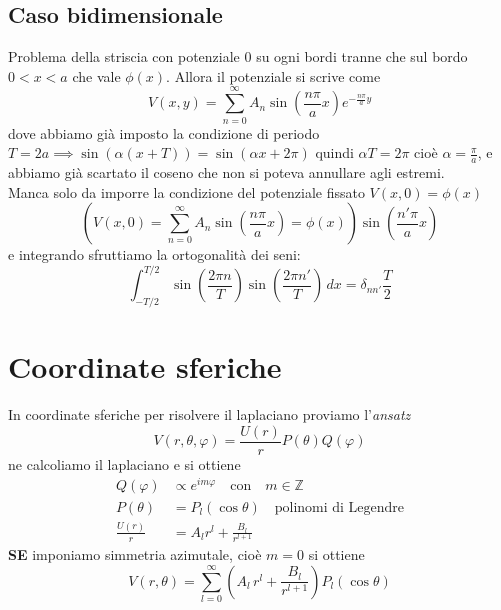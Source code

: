 \subsection{Caso bidimensionale}
Problema della striscia con potenziale $ 0 $ su ogni bordi tranne che sul bordo $ 0<x<a $ che vale $ \phi(x) $.
Allora il potenziale si scrive come 
\begin{equation}
  V(x,y) = \sum_{n = 0}^{\infty} A_n \sin\left( \frac{n\pi}{a} x \right) e^{-\frac{n\pi}{a} y}
\end{equation}
dove abbiamo già imposto la condizione di periodo $ T = 2a \implies \sin (\alpha (x + T)) = \sin(\alpha x + 2\pi) $ quindi $ \alpha T = 2\pi $
cioè $ \alpha = \frac{\pi}{a} $, e abbiamo già scartato il coseno che non si poteva annullare agli estremi.\\
Manca solo da imporre la condizione del potenziale fissato $ V (x,0) = \phi(x) $ 
\begin{equation}
  \left( V(x,0) = \sum_{n = 0}^{\infty} A_n \sin\left( \frac{n\pi}{a} x \right) = \phi(x) \right) \sin\left(  \frac{n'\pi}{a} x \right)
\end{equation}
e integrando sfruttiamo la ortogonalità dei seni:
\begin{equation}
  \int_{-T/2}^{T/2} \sin \left( \frac{2\pi n}{T} \right) \sin \left( \frac{2\pi n'}{T} \right)  \,dx = \delta_{nn'} \frac{T}{2}
\end{equation}


\section{Coordinate sferiche}
In coordinate sferiche per risolvere il laplaciano proviamo l'\textit{ansatz}
\begin{equation}
  V(r, \theta, \varphi) = \frac{U (r)}{r} P(\theta) Q(\varphi)
\end{equation}
ne calcoliamo il laplaciano e si ottiene
\begin{align}
  Q (\varphi) &\propto e^{im\varphi} \quad \text{con} \quad m \in \mathbb{Z}
  \\
  P(\theta) &= P_l(\cos\theta) \quad \text{polinomi di Legendre}
  \\
  \frac{U(r)}{r} &= A_l r^l + \frac{B_l}{r^{l+1}}
\end{align}
\textbf{SE} imponiamo simmetria azimutale, cioè $ m = 0 $ si ottiene
\begin{equation}
  V(r, \theta) = \sum_{l=0}^{\infty} \left( A_l \, r^l + \frac{B_l}{r^{l+1}} \right) P_l\left( \cos \theta \right)
\end{equation}

